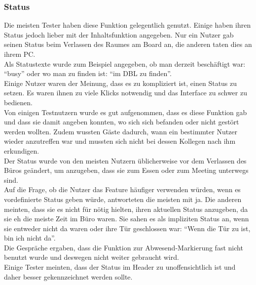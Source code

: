 


\subsubsection{Status}\label{Status}
Die meisten Tester haben diese Funktion gelegentlich genutzt.
Einige haben ihren Status jedoch lieber mit der Inhaltsfunktion angegeben.
Nur ein Nutzer gab seinen Status beim Verlassen des Raumes am Board an, die anderen taten dies an ihrem PC.
\\
Als Statustexte wurde zum Beispiel angegeben, ob man derzeit beschäftigt war: ``busy'' oder wo man zu finden ist: ``im DBL zu finden''.
\\
Einige Nutzer waren der Meinung, dass es zu kompliziert ist, einen Status zu setzen.
Es waren ihnen zu viele Klicks notwendig und das Interface zu schwer zu bedienen.
\\
Von einigen Testnutzern wurde es gut aufgenommen, dass es diese Funktion gab und dass sie damit angeben konnten, wo sich sich befanden oder nicht gestört werden wollten.
Zudem wussten Gäste dadurch, wann ein bestimmter Nutzer wieder anzutreffen war und mussten sich nicht bei dessen Kollegen nach ihm erkundigen.
\\
Der Status wurde von den meisten Nutzern üblicherweise vor dem Verlassen des Büros geändert, um anzugeben, dass sie zum Essen oder zum Meeting unterwegs sind.
\\
Auf die Frage, ob die Nutzer das Feature häufiger verwenden würden, wenn es vordefinierte Status geben würde, antworteten die meisten mit ja.
Die anderen meinten, dass sie es nicht für nötig hielten, ihren aktuellen Status anzugeben, da sie eh die meiste Zeit im Büro waren.
Sie sahen es als impliziten Status an, wenn sie entweder nicht da waren oder ihre Tür geschlossen war: ``Wenn die Tür zu ist, bin ich nicht da''.
\\
Die Gespräche ergaben, dass die Funktion zur Abwesend-Markierung fast nicht benutzt wurde und deswegen nicht weiter gebraucht wird.
\\
Einige Tester meinten, dass der Status im Header zu unoffensichtlich ist und daher besser gekennzeichnet werden sollte.

